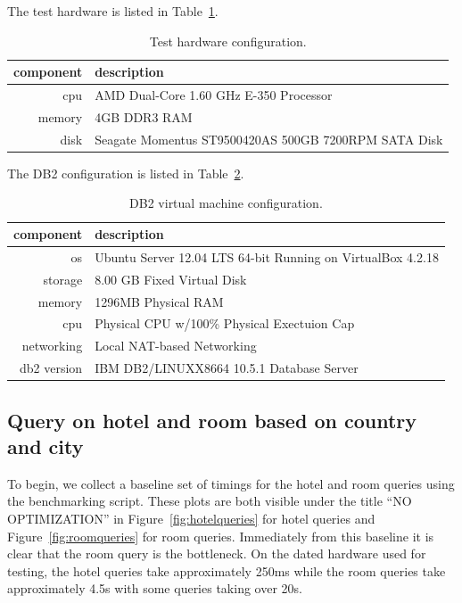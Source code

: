 \documentclass[letterpaper]{article}%
\begin{document}
The test hardware is listed in Table~\ref{tab:testhardware}.

\begin{table}[h]
  \centering
  \small
  \begin{tabular}{rl}
    \toprule
    component & description \\
    \midrule
    cpu & AMD Dual-Core 1.60 GHz E-350 Processor \\
    memory & 4GB DDR3 RAM \\
    disk & Seagate Momentus ST9500420AS 500GB 7200RPM SATA Disk \\
    \bottomrule
  \end{tabular}
  \caption{Test hardware configuration.}
  \label{tab:testhardware}
\end{table}

The DB2 configuration is listed in Table~\ref{tab:db2setup}.

\begin{table}[h]
  \centering
  \small
  \begin{tabular}{rl}
    \toprule
    component & description \\
    \midrule
    os & Ubuntu Server 12.04 LTS 64-bit Running on VirtualBox 4.2.18 \\
    storage & 8.00 GB Fixed Virtual Disk \\
    memory & 1296MB Physical RAM \\
    cpu & Physical CPU w/100\% Physical Exectuion Cap \\
    networking & Local NAT-based Networking \\
    db2 version & IBM DB2/LINUXX8664 10.5.1 Database Server \\
    \bottomrule
  \end{tabular}
  \caption{DB2 virtual machine configuration.}
  \label{tab:db2setup}
\end{table}

\subsection{Query on hotel and room based on country and city}

To begin, we collect a baseline set of timings for the hotel and room queries
using the benchmarking script. These plots are both visible under the title
``NO OPTIMIZATION'' in Figure~\ref{fig:hotelqueries} for hotel queries and
Figure~\ref{fig:roomqueries} for room queries. Immediately from this baseline
it is clear that the room query is the bottleneck. On the dated hardware used
for testing, the hotel queries take approximately 250ms while the room queries
take approximately 4.5s with some queries taking over 20s.
\end{document}
